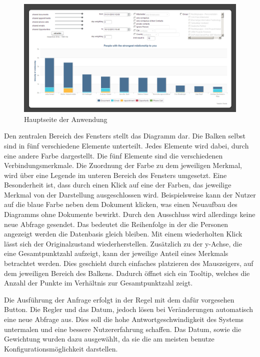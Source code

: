\begin{figure}[htbp]
\centering
\includegraphics[width=\textwidth]{pics/final_screen.png}
\caption{Hauptseite der Anwendung}
\label{ergebniss_oberflaeche_haupt}
\end{figure}

Den zentralen Bereich des Fensters stellt das Diagramm dar. Die Balken selbst sind in fünf verschiedene Elemente unterteilt. Jedes Elemente wird dabei, durch eine andere Farbe dargestellt. Die fünf Elemente sind die verschiedenen Verbindungsmerkmale. Die Zuordnung der Farbe zu dem jeweiligen Merkmal, wird über eine Legende im unteren Bereich des Fensters umgesetzt. Eine Besonderheit ist, dass durch einen Klick auf eine der Farben, das jeweilige Merkmal von der Darstellung ausgeschlossen wird. Beispielsweise kann der Nutzer auf die blaue Farbe neben dem Dokument klicken, was einen Neuaufbau des Diagramms ohne Dokumente bewirkt. Durch den Ausschluss wird allerdings keine neue Abfrage gesendet. Das  bedeutet die Reihenfolge in der die Personen angezeigt werden die Datenbasis gleich  bleiben. Mit einem wiederholten Klick lässt sich der Originalzustand wiederherstellen. Zusätzlich zu der y-Achse, die eine Gesamtpunktzahl aufzeigt, kann der jeweilige Anteil eines Merkmals betrachtet werden. Dies geschieht durch einfaches platzieren des Mauszeigers, auf dem jeweiligen Bereich des Balkens. Dadurch öffnet sich ein Tooltip, welches die Anzahl der Punkte im Verhältnis zur Gesamtpunktzahl zeigt.

Die Ausführung der Anfrage erfolgt in der Regel mit dem dafür vorgesehen Button. Die Regler und das Datum, jedoch lösen bei Veränderungen automatisch eine neue Abfrage aus. Dies soll die hohe Antwortgeschwindigkeit des Systems untermalen und eine bessere Nutzererfahrung schaffen. Das Datum, sowie die Gewichtung wurden dazu ausgewählt, da sie die am meisten benutze Konfigurationsmöglichkeit darstellen.

